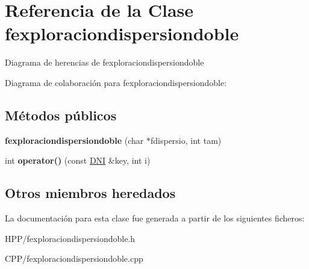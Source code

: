 \hypertarget{classfexploraciondispersiondoble}{}\section{Referencia de la Clase fexploraciondispersiondoble}
\label{classfexploraciondispersiondoble}


Diagrama de herencias de fexploraciondispersiondoble


Diagrama de colaboración para fexploraciondispersiondoble\+:
\subsection*{Métodos públicos}
\begin{DoxyCompactItemize}
\item 
\mbox{\label{classfexploraciondispersiondoble_a9c7e0cfb4d4044feda0f2e41b4b0ca6c}} 
{\bfseries fexploraciondispersiondoble} (char $\ast$fdispersio, int tam)
\item 
\mbox{\label{classfexploraciondispersiondoble_a4f8b3adc1915daf11177bafeca9aaef4}} 
int {\bfseries operator()} (const \hyperlink{classDNI}{D\+NI} \&key, int i)
\end{DoxyCompactItemize}
\subsection*{Otros miembros heredados}


La documentación para esta clase fue generada a partir de los siguientes ficheros\+:\begin{DoxyCompactItemize}
\item 
H\+P\+P/fexploraciondispersiondoble.\+h\item 
C\+P\+P/fexploraciondispersiondoble.\+cpp\end{DoxyCompactItemize}
